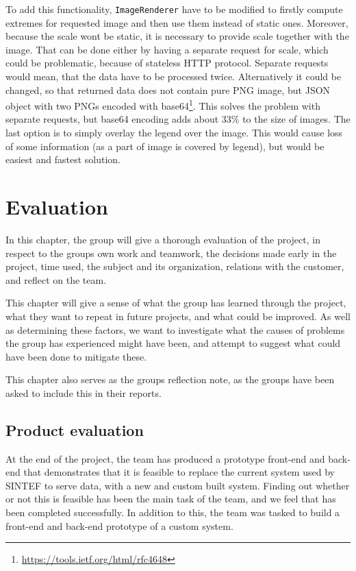 \documentclass[11pt,a4paper,titlepage,oneside]{report}
\begin{document}
To add this functionality, \texttt{ImageRenderer} have to be modified to firstly compute extremes for requested image and then use them instead of static ones. Moreover, because the scale wont be static, it is necessary to provide scale together with the image. That can be done either by having a separate request for scale, which could be problematic, because of stateless HTTP protocol. Separate requests would mean, that the data have to be processed twice. Alternatively it could be changed, so that returned data does not contain pure \gls{PNG} image, but JSON object with two \gls{PNG}s encoded with base64\footnote{\url{https://tools.ietf.org/html/rfc4648}}. This solves the problem with separate requests, but base64 encoding adds about 33\% to the size of images. The last option is to simply overlay the legend over the image. This would cause loss of some information (as a part of image is covered by legend), but would be easiest and fastest solution.

\chapter{Evaluation}
In this chapter, the group will give a thorough evaluation of the project, in respect to the groups own work and teamwork, the decisions made early in the project, time used, the subject and its organization, relations with the customer, and reflect on the team. 

This chapter will give a sense of what the group has learned through the project, what they want to repeat in future projects, and what could be improved. As well as determining these factors, we want to investigate what the causes of problems the group has experienced might have been, and attempt to suggest what could have been done to mitigate these. 

This chapter also serves as the groups reflection note, as the groups have been asked to include this in their reports. 

\section{Product evaluation}
At the end of the project, the team has produced a \gls{prototype} \gls{front-end} and \gls{back-end} that demonstrates that it is feasible to replace the current system used by SINTEF to serve data, with a new and custom built system. Finding out whether or not this is feasible has been the main task of the team, and we feel that has been completed successfully. In addition to this, the team was tasked to build a front-end and back-end prototype of a custom system.
\end{document}
